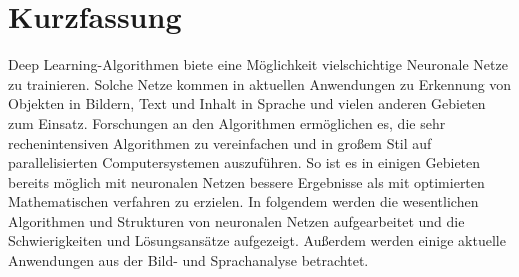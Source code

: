 \chapter{Kurzfassung}

Deep Learning-Algorithmen biete eine Möglichkeit vielschichtige Neuronale Netze zu trainieren. Solche Netze kommen in aktuellen Anwendungen zu Erkennung von Objekten in Bildern, Text und Inhalt in Sprache und vielen anderen Gebieten zum Einsatz. Forschungen an den Algorithmen ermöglichen es, die sehr rechenintensiven Algorithmen zu vereinfachen und in großem Stil auf parallelisierten Computersystemen auszuführen. So ist es in einigen Gebieten bereits möglich mit neuronalen Netzen bessere Ergebnisse als mit optimierten Mathematischen verfahren zu erzielen. In folgendem werden die wesentlichen Algorithmen und Strukturen von neuronalen Netzen aufgearbeitet und die Schwierigkeiten und Lösungsansätze aufgezeigt. Außerdem werden einige aktuelle Anwendungen aus der Bild- und Sprachanalyse betrachtet.